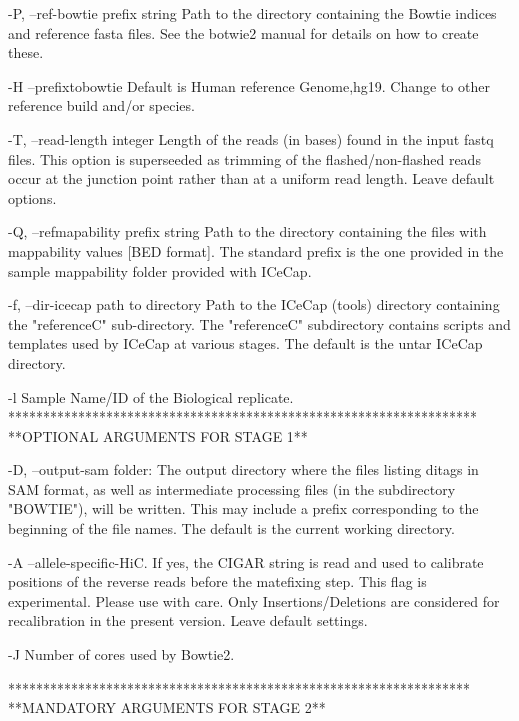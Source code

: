 \documentclass[10pt,a4paper]{article}
\begin{document}
        -P, --ref-bowtie prefix string     Path to the directory containing the Bowtie indices and reference fasta files. See the botwie2 manual for details on how to create these.

        -H  --prefixtobowtie         Default is Human reference Genome,hg19. Change to other reference build and/or species. 
        
        -T, --read-length integer    Length of the reads (in bases) found in the input fastq files. This option is superseeded as trimming of the flashed/non-flashed reads occur at the junction point rather than at a uniform read length. Leave default options.

        -Q, --refmapability prefix string    Path to the directory containing the files with mappability values [BED format].  The standard prefix is the one provided in the sample mappability folder provided with ICeCap. 

        -f, --dir-icecap path to directory     Path to the ICeCap (tools) directory containing the "referenceC" sub-directory.  The "referenceC" subdirectory contains scripts and templates used by ICeCap at various stages.  The default is the untar ICeCap directory.
       
        -l Sample Name/ID of the Biological replicate.\\

*******************************************************************\\
**OPTIONAL ARGUMENTS FOR STAGE 1**

        -D, --output-sam folder: The output directory where the files listing ditags in SAM format, as well as intermediate processing files (in the subdirectory "BOWTIE"), will be written.  This may include a prefix corresponding to the beginning of the file names.  The default is the current working directory.
       
        -A   --allele-specific-HiC. If yes, the CIGAR string is read and used to calibrate positions of the reverse reads before the matefixing step.
                                    This flag is experimental. Please use with care. Only Insertions/Deletions are considered for recalibration in the 
                                    present version. Leave default settings.

        -J  Number of cores used by Bowtie2.

******************************************************************\\
**MANDATORY ARGUMENTS FOR STAGE 2**
\end{document}
